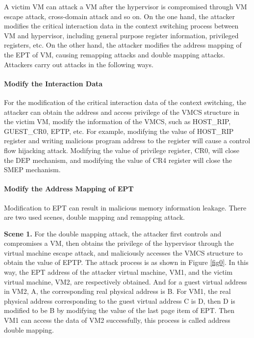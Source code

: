 \documentclass[conference]{IEEEtran}
\begin{document}

A victim VM can attack a VM after the hypervisor is compromised through VM escape attack, cross-domain attack and so on.
On the one hand, the attacker modifies the critical interaction data in the context switching process between VM and hypervisor, including general purpose register information, privileged registers, etc. On the other hand, the attacker modifies the address mapping of the EPT of VM, causing remapping attacks and double mapping attacks. Attackers carry out attacks in the following ways.

\paragraph{Modify the Interaction Data}
For the modification of the critical interaction data of the context switching, the attacker can obtain the address and access privilege of the VMCS structure in the victim VM, modify the information of the VMCS, such as HOST\_RIP, GUEST\_CR0, EPTP, etc. For example, modifying the value of HOST\_RIP register and writing malicious program address to the register will cause a control flow hijacking attack. Modifying the value of privilege register, CR0, will close the DEP mechanism, and modifying the value of CR4 register will close the SMEP mechanism.

\paragraph{Modify the Address Mapping of EPT}
Modification to EPT can result in malicious memory information leakage. There are two used scenes, double mapping and remapping attack.

\textbf{Scene 1.} 
    For the double mapping attack, the attacker first controls and compromises a VM, then obtains the privilege of the hypervisor through the virtual machine escape attack, and maliciously accesses the VMCS structure to obtain the value of EPTP. The attack process is as shown in Figure \ref{fig0}. In this way, the EPT address of the attacker virtual machine, VM1, and the victim virtual machine, VM2, are respectively obtained. And for a guest virtual address in VM2, A, the corresponding real physical address is B. For VM1, the real physical address corresponding to the guest virtual address C is D, then D is modified to be B by modifying the value of the last page item of EPT. Then VM1 can access the data of VM2 successfully, this process is called address double mapping.
\end{document}
